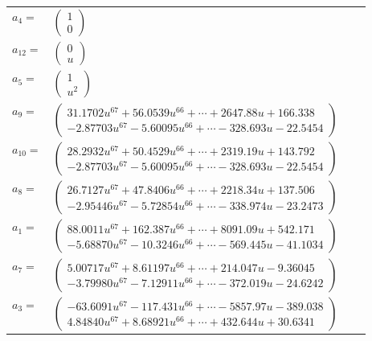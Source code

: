 \documentclass[1p]{elsarticle_modified}
\theoremstyle{definition}
\begin{document}
\begin{tabular}{m{7pt} m{180pt} m{7pt} m{180pt} }
\flushright $a_{4}=$&$\begin{pmatrix}1\\0\end{pmatrix}$ \\
\flushright $a_{12}=$&$\begin{pmatrix}0\\u\end{pmatrix}$ \\
\flushright $a_{5}=$&$\begin{pmatrix}1\\u^2\end{pmatrix}$ \\
\flushright $a_{9}=$&$\begin{pmatrix}31.1702 u^{67}+56.0539 u^{66}+\cdots+2647.88 u+166.338\\-2.87703 u^{67}-5.60095 u^{66}+\cdots-328.693 u-22.5454\end{pmatrix}$ \\
\flushright $a_{10}=$&$\begin{pmatrix}28.2932 u^{67}+50.4529 u^{66}+\cdots+2319.19 u+143.792\\-2.87703 u^{67}-5.60095 u^{66}+\cdots-328.693 u-22.5454\end{pmatrix}$ \\
\flushright $a_{8}=$&$\begin{pmatrix}26.7127 u^{67}+47.8406 u^{66}+\cdots+2218.34 u+137.506\\-2.95446 u^{67}-5.72854 u^{66}+\cdots-338.974 u-23.2473\end{pmatrix}$ \\
\flushright $a_{1}=$&$\begin{pmatrix}88.0011 u^{67}+162.387 u^{66}+\cdots+8091.09 u+542.171\\-5.68870 u^{67}-10.3246 u^{66}+\cdots-569.445 u-41.1034\end{pmatrix}$ \\
\flushright $a_{7}=$&$\begin{pmatrix}5.00717 u^{67}+8.61197 u^{66}+\cdots+214.047 u-9.36045\\-3.79980 u^{67}-7.12911 u^{66}+\cdots-372.019 u-24.6242\end{pmatrix}$ \\
\flushright $a_{3}=$&$\begin{pmatrix}-63.6091 u^{67}-117.431 u^{66}+\cdots-5857.97 u-389.038\\4.84840 u^{67}+8.68921 u^{66}+\cdots+432.644 u+30.6341\end{pmatrix}$ \\

\end{tabular}
\end{document}
